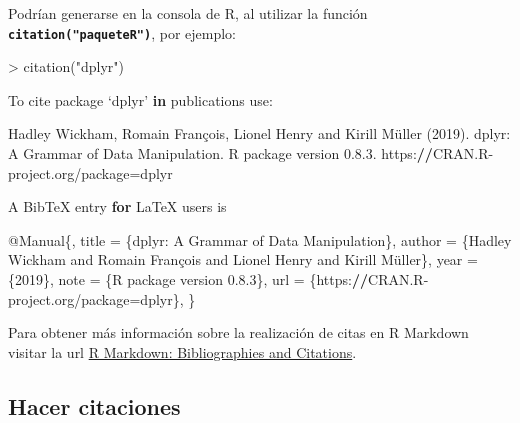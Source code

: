 \documentclass[12pt,a4paper,]{book}
\newenvironment{Shaded}{\begin{snugshade}}{\end{snugshade}}
\newcommand{\ControlFlowTok}[1]{\textcolor[rgb]{0.13,0.29,0.53}{\textbf{#1}}}
\newcommand{\DecValTok}[1]{\textcolor[rgb]{0.00,0.00,0.81}{#1}}
\newcommand{\ErrorTok}[1]{\textcolor[rgb]{0.64,0.00,0.00}{\textbf{#1}}}
\newcommand{\FloatTok}[1]{\textcolor[rgb]{0.00,0.00,0.81}{#1}}
\newcommand{\FunctionTok}[1]{\textcolor[rgb]{0.00,0.00,0.00}{#1}}
\newcommand{\NormalTok}[1]{#1}
\newcommand{\OtherTok}[1]{\textcolor[rgb]{0.56,0.35,0.01}{#1}}
\newcommand{\SpecialCharTok}[1]{\textcolor[rgb]{0.00,0.00,0.00}{#1}}
\newcommand{\StringTok}[1]{\textcolor[rgb]{0.31,0.60,0.02}{#1}}
\numberwithin{dummy}{section}
\theoremstyle{ocrenumbox}
\theoremstyle{blacknumex}
\theoremstyle{blacknumbox}
\theoremstyle{ocrenum}
\theoremstyle{ocrenum}
\begin{document}
Podrían generarse en la consola de R, al utilizar la función
\textbf{\texttt{citation("paqueteR")}}, por ejemplo:

\footnotesize

\begin{Shaded}
\begin{Highlighting}[]
\SpecialCharTok{\textgreater{}} \FunctionTok{citation}\NormalTok{(}\StringTok{"dplyr"}\NormalTok{)}

\NormalTok{To cite package ‘dplyr’ }\ControlFlowTok{in}\NormalTok{ publications use}\SpecialCharTok{:}

\NormalTok{  Hadley Wickham, Romain François, Lionel Henry and Kirill Müller (}\DecValTok{2019}\NormalTok{). dplyr}\SpecialCharTok{:}\NormalTok{ A}
\NormalTok{  Grammar of Data Manipulation. R package version }\DecValTok{0}\NormalTok{.}\DecValTok{8}\NormalTok{.}\FloatTok{3.}
\NormalTok{  https}\SpecialCharTok{:}\ErrorTok{//}\NormalTok{CRAN.R}\SpecialCharTok{{-}}\NormalTok{project.org}\SpecialCharTok{/}\NormalTok{package}\OtherTok{=}\NormalTok{dplyr}

\NormalTok{A BibTeX entry }\ControlFlowTok{for}\NormalTok{ LaTeX users is}

  \SpecialCharTok{@}\NormalTok{Manual\{,}
\NormalTok{    title }\OtherTok{=}\NormalTok{ \{dplyr}\SpecialCharTok{:}\NormalTok{ A Grammar of Data Manipulation\},}
\NormalTok{    author }\OtherTok{=}\NormalTok{ \{Hadley Wickham and Romain François and Lionel Henry and Kirill Müller\},}
\NormalTok{    year }\OtherTok{=}\NormalTok{ \{}\DecValTok{2019}\NormalTok{\},}
\NormalTok{    note }\OtherTok{=}\NormalTok{ \{R package version }\DecValTok{0}\NormalTok{.}\FloatTok{8.3}\NormalTok{\},}
\NormalTok{    url }\OtherTok{=}\NormalTok{ \{https}\SpecialCharTok{:}\ErrorTok{//}\NormalTok{CRAN.R}\SpecialCharTok{{-}}\NormalTok{project.org}\SpecialCharTok{/}\NormalTok{package}\OtherTok{=}\NormalTok{dplyr\},}
\NormalTok{  \}}
\end{Highlighting}
\end{Shaded}

\normalsize

Para obtener más información sobre la realización de citas en R Markdown
visitar la url
\href{https://rmarkdown.rstudio.com/authoring_bibliographies_and_citations.html}{R
Markdown: Bibliographies and Citations}.

\hypertarget{hacer-citaciones}{%
\subsection{Hacer citaciones}\label{hacer-citaciones}}
\end{document}
